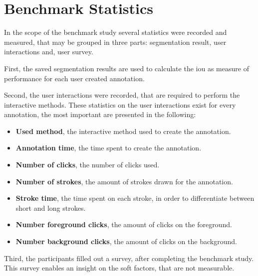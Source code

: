 
\section{Benchmark Statistics}\label{ord:ch4:sec3}

In the scope of the benchmark study several statistics were recorded and measured, that may be grouped in three parts: segmentation result, user interactions and, user survey.

First, the saved segmentation results are used to calculate the \gls{iou} as measure of performance for each user created annotation.

Second, the user interactions were recorded, that are required to perform the interactive methods.
These statistics on the user interactions exist for every annotation, the most important are presented in the following:
\begin{itemize}
	\item \textbf{Used method}, the interactive method used to create the annotation.
	\item \textbf{Annotation time}, the time spent to create the annotation.
	\item \textbf{Number of clicks}, the number of clicks used.
	\item \textbf{Number of strokes}, the amount of strokes drawn for the annotation.
	\item \textbf{Stroke time}, the time spent on each stroke, in order to differentiate between short and long strokes.
	\item \textbf{Number foreground clicks}, the amount of clicks on the foreground.
	\item \textbf{Number background clicks}, the amount of clicks on the background.
	
\end{itemize}

Third, the participants filled out a survey, after completing the benchmark study.
This survey enables an insight on the soft factors, that are not measurable.

